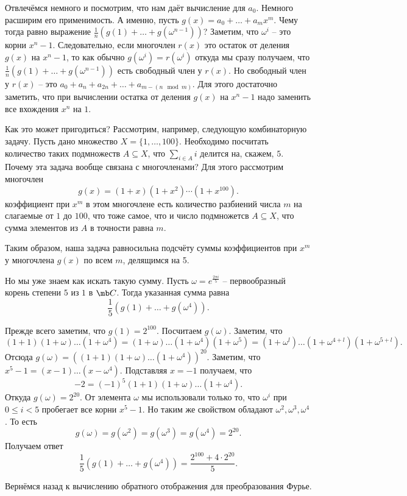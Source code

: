Отвлечёмся немного и посмотрим, что нам даёт вычисление для $a_0$. Немного расширим его применимость. А именно, пусть $g(x)=a_0+\dots+ a_m x^m$. Чему тогда равно выражение $\frac{1}{n}\left(g(1)+\dots+g(\omega^{n-1})\right)$? Заметим, что $\omega^i$ -- это корни $x^n-1$. Следовательно, если многочлен $r(x)$ это остаток от деления $g(x)$ на $x^n-1$, то как обычно $g(\omega^i)=r(\omega^i)$ откуда мы сразу  получаем, что $\frac{1}{n}\left(g(1)+\dots+g(\omega^{n-1})\right)$ есть свободный член у $r(x)$. Но свободный член у $r(x)$ -- это $a_0+a_n+a_{2n}+\dots + a_{m-(n\mod m)}$. Для этого достаточно заметить, что при вычислении остатка от деления $g(x)$ на $x^n-1$ надо заменить все вхождения $x^n$ на $1$.

Как это может пригодиться? Рассмотрим, например, следующую комбинаторную задачу. Пусть дано множество $X=\{1,\dots,100\}$. Необходимо посчитать количество таких подмножеств $A\subseteq X$, что $\sum_{i\in A} i$ делится на, скажем, $5$. Почему эта задача вообще связана с многочленами? Для этого рассмотрим многочлен $$g(x)=(1+x)(1+x^2)\cdots(1+x^{100}).$$
коэффициент при $x^m$ в этом многочлене есть количество разбиений числа $m$ на слагаемые от $1$ до $100$, что тоже самое, что и число подмножетсв $A \subseteq X$, что сумма элементов из $A$ в точности равна $m$. 

Таким образом, наша задача равносильна подсчёту суммы коэффициентов при $x^m$ у многочлена $g(x)$ по всем $m$, делящимся на 5.

Но мы уже знаем как искать такую сумму. Пусть $\omega=e^{\frac{2\pi i}{5}}$ -- первообразный корень степени $5$ из $1$ в $\mb C$. Тогда указанная сумма равна 
$$\frac{1}{5}\left(g(1)+\dots+g(\omega^4)\right).$$

Прежде всего заметим, что $g(1)=2^{100}$. Посчитаем $g(\omega)$. Заметим, что $$(1+1)(1+\omega)\dots(1+\omega^4)=(1+\omega)\dots(1+\omega^4)(1+\omega^5)=(1+\omega^l)\dots(1+\omega^{4+l})(1+\omega^{5+l}).$$
Отсюда $g(\omega)= ((1+1)(1+\omega)\dots(1+\omega^4))^{20}$. Заметим, что $x^5-1=(x-1)\dots(x-\omega^4)$. Подставляя $x=-1$ получаем, что 
$$-2=(-1)^5(1+1)(1+\omega)\dots(1+\omega^4).$$
Откуда $g(\omega)=2^{20}$. От элемента $\omega$ мы использовали только то, что $\omega^i$ при $0\leq i <5$ пробегает все корни $x^5-1$. Но таким же свойством обладают $\omega^2, \omega^3,\omega^4$. То есть $$g(\omega)=g(\omega^2)=g(\omega^3)=g(\omega^4)=2^{20}.$$
Получаем ответ 
$$\frac{1}{5}\left(g(1)+\dots+g(\omega^4)\right)=\frac{2^{100}+4\cdot 2^{20}}{5}.$$

Вернёмся назад к вычислению обратного отображения для преобразования Фурье.

